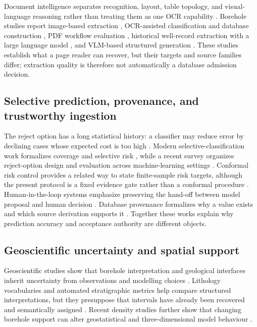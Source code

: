 \documentclass[a4paper,fleqn]{cas-sc}
\begin{document}
Document intelligence separates recognition, layout, table topology, and visual-language reasoning rather than treating them as one OCR capability \citep{smith2007tesseract, xu2020layoutlm, pfitzmann2022doclaynet, smock2022pubtables, kim2022donut, hu2024docowl2}. Borehole studies report image-based extraction \citep{zhang2020boreholeimages}, OCR-assisted classification and database construction \citep{han2024boreholeocr}, PDF workflow evaluation \citep{amini2023boreholepdf}, historical well-record extraction with a large language model \citep{ma2024historicalwell}, and VLM-based structured generation \citep{shiga2026boreholevlm}. These studies establish what a page reader can recover, but their targets and source families differ; extraction quality is therefore not automatically a database admission decision.

\subsection{Selective prediction, provenance, and trustworthy ingestion}

The reject option has a long statistical history: a classifier may reduce error by declining cases whose expected cost is too high \citep{chow1970reject}. Modern selective-classification work formalizes coverage and selective risk \citep{geifman2017selective, geifman2019selectivenet}, while a recent survey organizes reject-option design and evaluation across machine-learning settings \citep{hendrickx2024reject}. Conformal risk control provides a related way to state finite-sample risk targets, although the present protocol is a fixed evidence gate rather than a conformal procedure \citep{angelopoulos2024crc}. Human-in-the-loop systems emphasize preserving the hand-off between model proposal and human decision \citep{amershi2014interactive}. Database provenance formalizes why a value exists and which source derivation supports it \citep{buneman2001provenance, simmhan2005provenance}. Together these works explain why prediction accuracy and acceptance authority are different objects.

\subsection{Geoscientific uncertainty and spatial support}

Geoscientific studies show that borehole interpretation and geological interfaces inherit uncertainty from observations and modelling choices \citep{lark2014crosssection, pakyuzcharrier2018drillhole, wellmann2018uncertainty, wang2023interfaceuncertainty}. Lithology vocabularies and automated stratigraphic metrics help compare structured interpretations, but they presuppose that intervals have already been recovered and semantically assigned \citep{mccormick2023lithology, fuentes2020lithologicalmapping, garzon2026stratigraphicmetrics}. Recent density studies further show that changing borehole support can alter geostatistical and three-dimensional model behaviour \citep{tran2025boreholedensity, zhang2026boreholedensity}.
\end{document}
